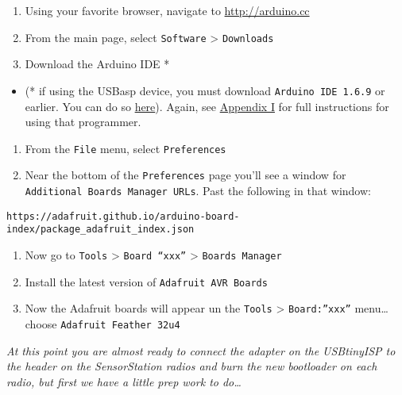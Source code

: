 \documentclass[
]{article}
\providecommand{\tightlist}{%
  \setlength{\itemsep}{0pt}\setlength{\parskip}{0pt}}
\begin{document}
\begin{enumerate}
\def\labelenumi{\arabic{enumi}.}
\tightlist
\item
  Using your favorite browser, navigate to \url{http://arduino.cc}
\item
  From the main page, select \texttt{Software} \textgreater{}
  \texttt{Downloads}
\item
  Download the Arduino IDE *
\end{enumerate}

\begin{itemize}
\tightlist
\item
  (* if using the USBasp device, you must download
  \texttt{Arduino\ IDE\ 1.6.9} or earlier. You can do so
  \href{https://www.arduino.cc/en/main/OldSoftwareReleases}{here}).
  Again, see \protect\hyperlink{Appendix_I}{Appendix I} for full
  instructions for using that programmer.
\end{itemize}

\begin{enumerate}
\def\labelenumi{\arabic{enumi}.}
\setcounter{enumi}{4}
\tightlist
\item
  From the \texttt{File} menu, select \texttt{Preferences}
\item
  Near the bottom of the \texttt{Preferences} page you'll see a window
  for \texttt{Additional\ Boards\ Manager\ URLs}. Past the following in
  that window:
\end{enumerate}

\begin{verbatim}
https://adafruit.github.io/arduino-board-index/package_adafruit_index.json
\end{verbatim}

\begin{enumerate}
\def\labelenumi{\arabic{enumi}.}
\setcounter{enumi}{4}
\item
  Now go to \texttt{Tools} \textgreater{} \texttt{Board\ “xxx”}
  \textgreater{} \texttt{Boards\ Manager}
\item
  Install the latest version of \texttt{Adafruit\ AVR\ Boards}
\item
  Now the Adafruit boards will appear un the \texttt{Tools}
  \textgreater{} \texttt{Board:”xxx”} menu\ldots choose
  \texttt{Adafruit\ Feather\ 32u4}
\end{enumerate}

\emph{At this point you are almost ready to connect the adapter on the
USBtinyISP to the header on the SensorStation radios and burn the new
bootloader on each radio, but first we have a little prep work to
do\ldots{}}
\end{document}
